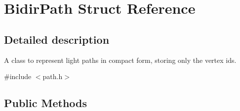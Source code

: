 \hypertarget{struct_bidir_path}{}\section{Bidir\+Path Struct Reference}
\label{struct_bidir_path}


\subsection{Detailed description}
A class to represent light paths in compact form, storing only the vertex ids. 

{\ttfamily \#include $<$path.\+h$>$}

\subsection*{Public Methods}
